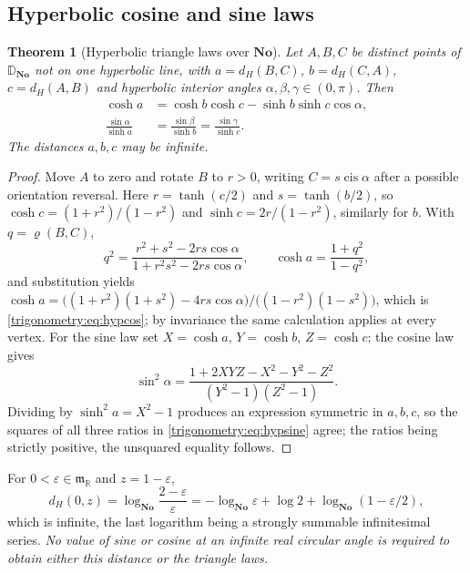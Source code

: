 \documentclass[11pt,letterpaper]{article}
\numberwithin{equation}{section}
\newtheorem{theorem}{Theorem}[section]
\theoremstyle{definition}
\theoremstyle{remark}
\newcommand{\No}{\mathbf{No}}
\newcommand{\R}{\mathbb R}
\newcommand{\mm}{\mathfrak m}
\newcommand{\Dd}{\mathbb D}
\newcommand{\eps}{\varepsilon}
\newcommand{\cis}{\operatorname{cis}}
\begin{document}
\subsection{Hyperbolic cosine and sine laws}
\begin{theorem}[Hyperbolic triangle laws over $\No$]\label{trigonometry:thm:hyperbolic}
Let $A,B,C$ be distinct points of $\Dd_{\No}$ not on one hyperbolic line, with
$a=d_H(B,C)$, $b=d_H(C,A)$, $c=d_H(A,B)$ and hyperbolic interior angles
$\alpha,\beta,\gamma\in(0,\pi)$. Then
\begin{align}
 \cosh a&=\cosh b\cosh c-\sinh b\sinh c\cos\alpha,\label{trigonometry:eq:hypcos}\\
 \frac{\sin\alpha}{\sinh a}&=\frac{\sin\beta}{\sinh b}=\frac{\sin\gamma}{\sinh c}.
 \label{trigonometry:eq:hypsine}
\end{align}
The distances $a,b,c$ may be infinite.
\end{theorem}
\begin{proof}
Move $A$ to zero and rotate $B$ to $r>0$, writing $C=s\cis\alpha$ after a possible orientation
reversal. Here $r=\tanh(c/2)$ and $s=\tanh(b/2)$, so $\cosh c=(1+r^2)/(1-r^2)$ and
$\sinh c=2r/(1-r^2)$, similarly for $b$. With $q=\varrho(B,C)$,
\[
 q^2=\frac{r^2+s^2-2rs\cos\alpha}{1+r^2s^2-2rs\cos\alpha},\qquad
 \cosh a=\frac{1+q^2}{1-q^2},
\]
and substitution yields
$\cosh a=\bigl((1+r^2)(1+s^2)-4rs\cos\alpha\bigr)/\bigl((1-r^2)(1-s^2)\bigr)$, which is
\cref{trigonometry:eq:hypcos}; by invariance the same calculation applies at every vertex. For the
sine law set $X=\cosh a$, $Y=\cosh b$, $Z=\cosh c$; the cosine law gives
\[
 \sin^2\alpha=\frac{1+2XYZ-X^2-Y^2-Z^2}{(Y^2-1)(Z^2-1)} .
\]
Dividing by $\sinh^2a=X^2-1$ produces an expression symmetric in $a,b,c$, so the squares of all
three ratios in \cref{trigonometry:eq:hypsine} agree; the ratios being strictly positive, the
unsquared equality follows.
\end{proof}

\begin{example}\label{trigonometry:ex:infinitedistance}
For $0<\eps\in\mm_{\R}$ and $z=1-\eps$,
\[
 d_H(0,z)=\log_{\No}\frac{2-\eps}\eps=-\log_{\No}\eps+\log2+\log_{\No}(1-\eps/2),
\]
which is infinite, the last logarithm being a strongly summable infinitesimal series. \emph{No
value of sine or cosine at an infinite real circular angle is required to obtain either this
distance or the triangle laws.}
\end{example}
\end{document}
